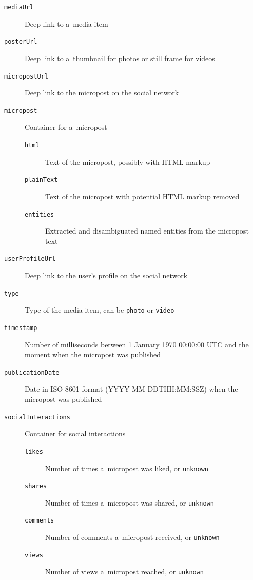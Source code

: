 \begin{description}
  \item[\texttt{mediaUrl}] Deep link to a~media item
  \item[\texttt{posterUrl}] Deep link to a~thumbnail for photos
    or still frame for videos
  \item[\texttt{micropostUrl}] Deep link to the micropost on
    the social network
  \item[\texttt{micropost}] Container for a~micropost
  \begin{description}
    \item[\texttt{html}] Text of the micropost,
      possibly with HTML      markup
    \item[\texttt{plainText}] Text of the micropost with
      potential HTML markup removed
    \item[\texttt{entities}] Extracted and disambiguated
      named entities from the micropost text
  \end{description}      
  \item[\texttt{userProfileUrl}] Deep link to the user's
    profile on the social network
  \item[\texttt{type}] Type of the media item,
    can be \texttt{photo} or \texttt{video}
  \item[\texttt{timestamp}] Number of milliseconds between
    1 January 1970 00:00:00 UTC and the moment
    when the micropost was published
  \item[\texttt{publicationDate}] Date in ISO 8601
    format (YYYY-MM-DDTHH:MM:SSZ) when the micropost was published
  \item[\texttt{socialInteractions}] Container for social
    interactions
  \begin{description}  
  \item[\texttt{likes}] Number of times a~micropost was liked, or
    \texttt{unknown}
  \item[\texttt{shares}] Number of times a~micropost was shared, or
    \texttt{unknown}
  \item[\texttt{comments}] Number of comments a~micropost
    received, or \texttt{unknown}
  \item[\texttt{views}] Number of views a~micropost reached, or
    \texttt{unknown}
  \end{description}    
\end{description}

